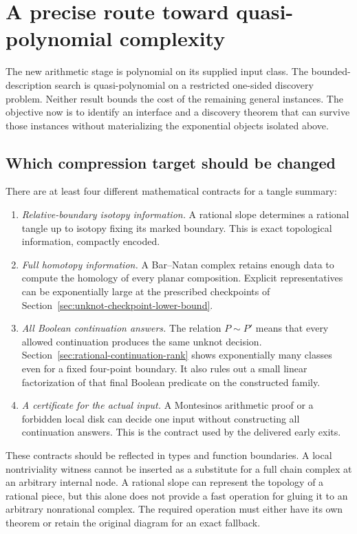 \section{A precise route toward quasi-polynomial complexity}
\label{sec:roadmap}

The new arithmetic stage is polynomial on its supplied input class.
The bounded-description search is quasi-polynomial on a restricted
one-sided discovery problem. Neither result bounds the cost of the
remaining general instances. The objective now is to identify an interface
and a discovery theorem that can survive those instances without
materializing the exponential objects isolated above.

\subsection{Which compression target should be changed}

There are at least four different mathematical contracts for a tangle
summary:
\begin{enumerate}
\item \emph{Relative-boundary isotopy information.}
A rational slope determines a rational tangle up to isotopy fixing its
marked boundary. This is exact topological information, compactly encoded.
\item \emph{Full homotopy information.}
A Bar--Natan complex retains enough data to compute the homology of every
planar composition. Explicit representatives can be exponentially large
at the prescribed checkpoints of Section~\ref{sec:unknot-checkpoint-lower-bound}.
\item \emph{All Boolean continuation answers.}
The relation \(P\sim P'\) means that every allowed continuation produces
the same unknot decision. Section~\ref{sec:rational-continuation-rank}
shows exponentially many classes even for a fixed four-point boundary.
It also rules out a small linear factorization of that final Boolean
predicate on the constructed family.
\item \emph{A certificate for the actual input.}
A Montesinos arithmetic proof or a forbidden local disk can decide
one input without constructing all continuation answers. This is the
contract used by the delivered early exits.
\end{enumerate}

These contracts should be reflected in types and function boundaries.
A local nontriviality witness cannot be inserted as a substitute for a
full chain complex at an arbitrary internal node. A rational slope can
represent the topology of a rational piece, but this alone does not provide
a fast operation for gluing it to an arbitrary nonrational complex.
The required operation must either have its own theorem or retain the
original diagram for an exact fallback.

